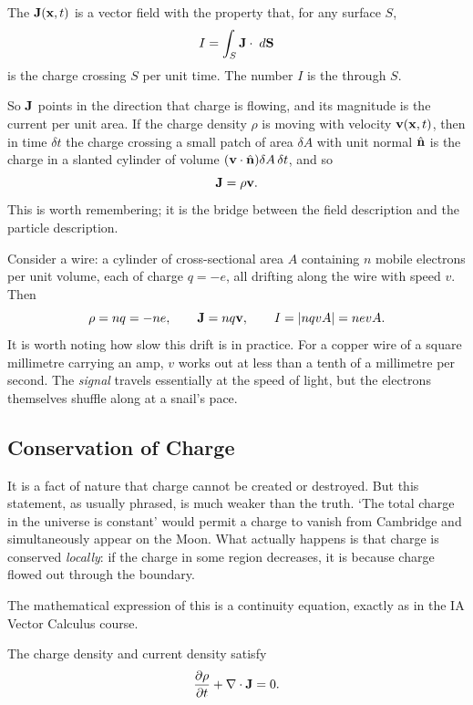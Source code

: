 \documentclass[a4paper]{scrartcl}
\newcommand{\hh}[1]{\hat{\vv{#1}}}
\begin{document}
\begin{definition}
	The  $\mathbf{J}(\mathbf{x}, t)$ is a vector field with the property that, for any surface $S$,
	$$
	I = \int_S \mathbf{J} \cdot \; d \mathbf{S}
	$$
	is the charge crossing $S$ per unit time. The number $I$ is the  through $S$.
\end{definition}

So $\mathbf{J}$ points in the direction that charge is flowing, and its magnitude is the current per unit area. If the charge density $\rho$ is moving with velocity $\mathbf{v}(\mathbf{x}, t)$, then in time $\delta t$ the charge crossing a small patch of area $\delta A$ with unit normal $\hh{n}$ is the charge in a slanted cylinder of volume $(\vv{v} \cdot \hh{n})\delta A \, \delta t$, and so
$$
\mathbf{J} = \rho \mathbf{v}.
$$
This is worth remembering; it is the bridge between the field description and the particle description.

\begin{example}
	Consider a wire: a cylinder of cross-sectional area $A$ containing $n$ mobile electrons per unit volume, each of charge $q = -e$, all drifting along the wire with speed $v$. Then
	$$
	\rho = nq = -ne, \qquad \mathbf{J} = nq \mathbf{v}, \qquad I = |nqvA| = nevA.
	$$
	It is worth noting how slow this drift is in practice. For a copper wire of a square millimetre carrying an amp, $v$ works out at less than a tenth of a millimetre per second. The \emph{signal} travels essentially at the speed of light, but the electrons themselves shuffle along at a snail's pace.
\end{example}

\subsection{Conservation of Charge}

It is a fact of nature that charge cannot be created or destroyed. But this statement, as usually phrased, is much weaker than the truth. `The total charge in the universe is constant' would permit a charge to vanish from Cambridge and simultaneously appear on the Moon. What actually happens is that charge is conserved \emph{locally}: if the charge in some region decreases, it is because charge flowed out through the boundary.

The mathematical expression of this is a continuity equation, exactly as in the IA Vector Calculus course.

\begin{law}
	The charge density and current density satisfy
	$$
	\frac{\partial \rho}{\partial t} + \nabla \cdot \mathbf{J} = 0.
	$$
\end{law}
\end{document}
